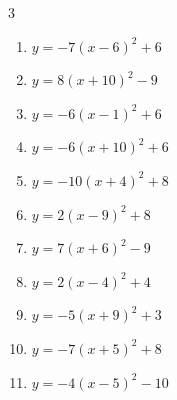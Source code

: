 \begin{multicols}{3}
\begin{enumerate}
  \item $\displaystyle y=-7\left( x-6\right)^{2}+6$

        \phantom{$\displaystyle 頂点\left( 6 , 6 \right)$}

  \item $\displaystyle y=8\left( x+10\right)^{2}-9$

        \phantom{$\displaystyle 頂点\left( -10 , -9 \right)$}

  \item $\displaystyle y=-6\left( x-1\right)^{2}+6$

        \phantom{$\displaystyle 頂点\left( 1 , 6 \right)$}

  \item $\displaystyle y=-6\left( x+10\right)^{2}+6$

        \phantom{$\displaystyle 頂点\left( -10 , 6 \right)$}

\columnbreak %

\resetques

  \item $\displaystyle y=-10\left( x+4\right)^{2}+8$

        \phantom{$\displaystyle 頂点\left( -4 , 8 \right)$}

  \item $\displaystyle y=2\left( x-9\right)^{2}+8$

        \phantom{$\displaystyle 頂点\left( 9 , 8 \right)$}

  \item $\displaystyle y=7\left( x+6\right)^{2}-9$

        \phantom{$\displaystyle 頂点\left( -6 , -9 \right)$}

  \item $\displaystyle y=2\left( x-4\right)^{2}+4$

        \phantom{$\displaystyle 頂点\left( 4 , 4 \right)$}

  \item $\displaystyle y=-5\left( x+9\right)^{2}+3$

        \phantom{$\displaystyle 頂点\left( -9 , 3 \right)$}

  \item $\displaystyle y=-7\left( x+5\right)^{2}+8$

        \phantom{$\displaystyle 頂点\left( -5 , 8 \right)$}

  \item $\displaystyle y=-4\left( x-5\right)^{2}-10$

        \phantom{$\displaystyle 頂点\left( 5 , -10 \right)$}


\end{enumerate}
\end{multicols}
